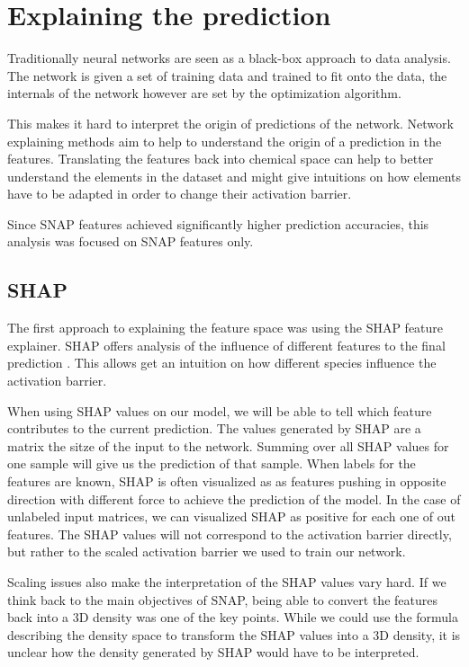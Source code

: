 \section{Explaining the prediction}

Traditionally neural networks are seen as a black-box approach to data analysis.
The network is given a set of training data and trained to fit onto the data,
the internals of the network however are set by the optimization algorithm.

This makes it hard to interpret the origin of predictions of the network.
Network explaining methods aim to help to understand the origin of a prediction in the features.
Translating the features back into chemical space can help to better understand 
the elements in the dataset and might give intuitions on how elements have to be adapted in order to change their activation barrier.

Since SNAP features achieved significantly higher prediction accuracies,
this analysis was focused on SNAP features only.

\subsection{SHAP}

The first approach to explaining the feature space was using the SHAP feature explainer.
SHAP offers analysis of the influence of different features to the final prediction \cite{NIPS2017_7062}.
This allows get an intuition on how different species influence the activation barrier.

When using SHAP values on our model, we will be able to tell which feature contributes to the current prediction.
The values generated by SHAP are a matrix the sitze of the input to the network.
Summing over all SHAP values for one sample will give us the prediction of that sample.
When labels for the features are  known, SHAP is often visualized as as features pushing in opposite direction with different force 
to achieve the prediction of the model.
In the case of unlabeled input matrices, we can visualized SHAP as positive for each one of out features.
The SHAP values will not correspond to the activation barrier directly,
but rather to the scaled activation barrier we used to train our network.

Scaling issues also make the interpretation of the SHAP values vary hard.
If we think back to the main objectives of SNAP, being able to convert the features back into 
a 3D density was one of the key points.
While we could use the formula describing the density space to transform the SHAP values 
into a 3D density, it is unclear how the density generated by SHAP would have to be interpreted.

